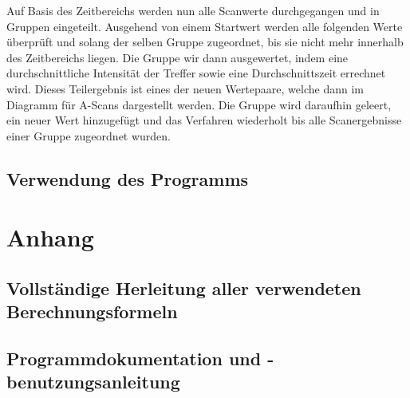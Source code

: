 \documentclass[reducespace,stylepage,semiarbeit]{spezidoc}
\begin{document}
Auf Basis des Zeitbereichs werden nun alle Scanwerte durchgegangen und in Gruppen eingeteilt. 
Ausgehend von einem Startwert werden alle folgenden Werte überprüft und solang der selben Gruppe zugeordnet, bis sie nicht mehr innerhalb des Zeitbereichs liegen. 
Die Gruppe wir dann ausgewertet, indem eine durchschnittliche Intensität der Treffer sowie eine Durchschnittszeit errechnet wird. 
Dieses Teilergebnis ist eines der neuen Wertepaare, welche dann im Diagramm für A-Scans dargestellt werden. 
Die Gruppe wird daraufhin geleert, ein neuer Wert hinzugefügt und das Verfahren wiederholt bis alle Scanergebnisse einer Gruppe zugeordnet wurden.


\subsection{Verwendung des Programms} %



\newpage
\section{Anhang}

\subsection{Vollständige Herleitung aller verwendeten Berechnungsformeln}

\subsection{Programmdokumentation und -benutzungsanleitung}



\eidesstattlicheerklaerung
\end{document}
